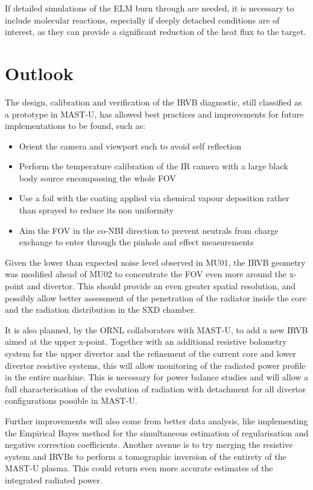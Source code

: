If detailed simulations of the ELM burn through are needed, it is necessary to include molecular reactions, especially if deeply detached conditions are of interest, as they can provide a significant reduction of the heat flux to the target.


\section{Outlook}\label{Outlook}


The design, calibration and verification of the IRVB diagnostic, still classified as a prototype in MAST-U, has allowed best practices and improvements for future implementations to be found, such as:

\begin{itemize}
    \item Orient the camera and viewport such to avoid self reflection
    \item Perform the temperature calibration of the IR camera with a large black body source encompassing the whole FOV
    \item Use a foil with the coating applied via chemical vapour deposition rather than sprayed to reduce its non uniformity
    \item Aim the FOV in the co-NBI direction to prevent neutrals from charge exchange to enter through the pinhole and effect measurements
\end{itemize}

Given the lower than expected noise level observed in MU01, the IRVB geometry was modified ahead of MU02 to concentrate the FOV even more around the x-point and divertor. This should provide an even greater spatial resolution, and possibly allow better assessment of the penetration of the radiator inside the core and the radiation distribution in the SXD chamber.

It is also planned, by the ORNL collaborators with MAST-U, to add a new IRVB aimed at the upper x-point. Together with an additional resistive bolometry system for the upper divertor and the refinement of the current core and lower divertor resistive systems, this will allow monitoring of the radiated power profile in the entire machine. This is necessary for power balance studies and will allow a full characterisation of the evolution of radiation with detachment for all divertor configurations possible in MAST-U.

Further improvements will also come from better data analysis, like implementing the Empirical Bayes method for the simultaneous estimation of regularisation and negative correction coefficients. Another avenue is to try merging the resistive system and IRVBs to perform a tomographic inversion of the entirety of the MAST-U plasma. This could return even more accurate estimates of the integrated radiated power.

